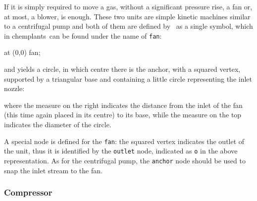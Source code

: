 \documentclass[12pt]{article}						%
\newcommand*{\ac}[1]{%
		\textsmaller{#1}%
	}
\newcommand*{\chpn}[1]{\texttt{#1}}				%
\newcommand*{\chpp}[1]{\texttt{#1}}				%
\newcommand*{\chemplants}{chemplants}
\newcommand*{\UNICHIM}{\ac{UNICHIM}}
\begin{document}
If it is simply required to move a gas, without a significant pressure rise, a
fan or, at most, a blower, is enough. These two units are simple kinetic machines
similar to a centrifugal pump and both of them are defined by \UNICHIM\ as a
single symbol, which in \chemplants\ can be found under the name of \chpp{fan}:
\begin{chpcode}
	\pic at (0,0) {fan};
\end{chpcode}
and yields a circle, in which centre there is the anchor, with a squared
vertex, supported by a triangular base and containing a little circle
representing the inlet nozzle:
\begin{center}
\end{center}
where the measure on the right indicates the distance from the inlet of the fan
(this time again placed in its centre) to its base, while the measure on the top
indicates the diameter of the circle.

A special node is defined for the \chpp{fan}: the squared vertex indicates the
outlet of the unit, thus it is identified by the \chpn{outlet} node, indicated
as \chpn{o} in the above representation. As for the centrifugal pump, the
\chpn{anchor} node should be used to snap the inlet stream to the fan.

\subsubsection{Compressor}
\end{document}
